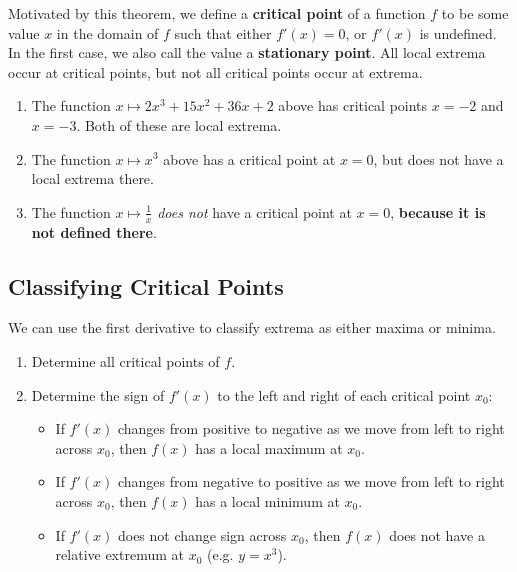 Motivated by this theorem, we define a \textbf{critical point} of a function $ f $ to be some value $ x $ in the domain of $ f $ such
that either $ f'(x) = 0 $, or $ f'(x) $ is undefined. In the first case, we also call the value a \textbf{stationary point}. All local
extrema occur at critical points, but not all critical points occur at extrema.

\begin{exs}\leavevmode
  \begin{enumerate}
    \item The function $ x \mapsto 2x^3 + 15x^2 + 36x + 2 $ above has critical points $ x = -2 $ and $ x = -3 $. Both of
          these are local extrema.
    \item The function $ x \mapsto x^3 $ above has a critical point at $ x = 0 $, but does not have a local extrema there.
    \item The function $ x \mapsto \frac{1}{x} $ \textit{does not} have a critical point at $ x = 0 $, \textbf{because it is not defined there}.
  \end{enumerate}
\end{exs}

\subsection*{Classifying Critical Points}
We can use the first derivative to classify extrema as either maxima or minima.
\begin{enumerate}
  \item Determine all critical points of $ f $.
  \item Determine the sign of $ f'(x) $ to the left and right of each critical point $ x_0 $:
    \begin{itemize}
      \item If $ f'(x) $ changes from positive to negative as we move from left to right across $ x_0 $, then $ f(x) $ has a local maximum at $ x_0 $.
      \item If $ f'(x) $ changes from negative to positive as we move from left to right across $ x_0 $, then $ f(x) $ has a local minimum at $ x_0 $.
      \item If $ f'(x) $ does not change sign across $ x_0 $, then $ f(x) $ does not have a relative extremum at $ x_0 $ (e.g. $ y = x^3 $).
    \end{itemize}
\end{enumerate}

